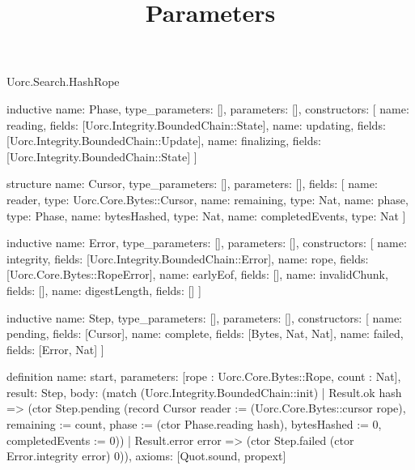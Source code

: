\begin{lexlean}{Uorc.Search.HashRope}
\title{Parameters}
\begin{semanticmodule}
inductive{
  name: Phase,
  type_parameters: [],
  parameters: [],
  constructors: [
    {name: reading, fields: [Uorc.Integrity.BoundedChain::State]},
    {name: updating, fields: [Uorc.Integrity.BoundedChain::Update]},
    {name: finalizing, fields: [Uorc.Integrity.BoundedChain::State]}
  ]
}

structure{
  name: Cursor,
  type_parameters: [],
  parameters: [],
  fields: [
    {name: reader, type: Uorc.Core.Bytes::Cursor},
    {name: remaining, type: Nat},
    {name: phase, type: Phase},
    {name: bytesHashed, type: Nat},
    {name: completedEvents, type: Nat}
  ]
}

inductive{
  name: Error,
  type_parameters: [],
  parameters: [],
  constructors: [
    {name: integrity, fields: [Uorc.Integrity.BoundedChain::Error]},
    {name: rope, fields: [Uorc.Core.Bytes::RopeError]},
    {name: earlyEof, fields: []},
    {name: invalidChunk, fields: []},
    {name: digestLength, fields: []}
  ]
}

inductive{
  name: Step,
  type_parameters: [],
  parameters: [],
  constructors: [
    {name: pending, fields: [Cursor]},
    {name: complete, fields: [Bytes, Nat, Nat]},
    {name: failed, fields: [Error, Nat]}
  ]
}

definition{
  name: start,
  parameters: [rope : Uorc.Core.Bytes::Rope, count : Nat],
  result: Step,
  body: (match (Uorc.Integrity.BoundedChain::init)
    | Result.ok hash => (ctor Step.pending (record Cursor {reader := (Uorc.Core.Bytes::cursor rope), remaining := count, phase := (ctor Phase.reading hash), bytesHashed := 0, completedEvents := 0}))
    | Result.error error => (ctor Step.failed (ctor Error.integrity error) 0)),
  axioms: [Quot.sound, propext]
}


\end{semanticmodule}
\end{lexlean}

